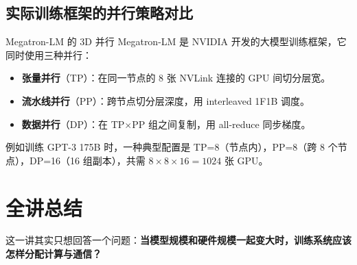 \documentclass[a4paper]{article}
\begin{document}
\subsection{实际训练框架的并行策略对比}

\begin{table}[H]
\centering
\small
{}
\caption{主流分布式训练框架对比}
\end{table}

\begin{knowledgebox}{Megatron-LM 的 3D 并行}
Megatron-LM 是 NVIDIA 开发的大模型训练框架，它同时使用三种并行：
\begin{itemize}
    \item \textbf{张量并行}（TP）：在同一节点的 8 张 NVLink 连接的 GPU 间切分层宽。
    \item \textbf{流水线并行}（PP）：跨节点切分层深度，用 interleaved 1F1B 调度。
    \item \textbf{数据并行}（DP）：在 TP$\times$PP 组之间复制，用 all-reduce 同步梯度。
\end{itemize}
例如训练 GPT-3 175B 时，一种典型配置是 TP=8（节点内），PP=8（跨 8 个节点），DP=16（16 组副本），共需 $8 \times 8 \times 16 = 1024$ 张 GPU。
\end{knowledgebox}

\section{全讲总结}

这一讲其实只想回答一个问题：\textbf{当模型规模和硬件规模一起变大时，训练系统应该怎样分配计算与通信？}
\end{document}
